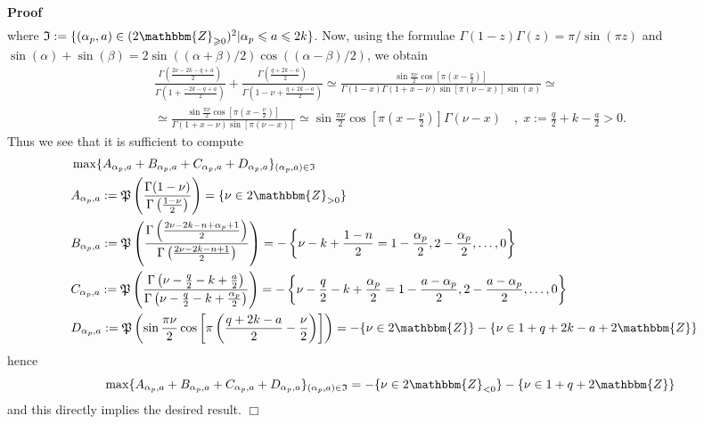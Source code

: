 \documentclass{article}
\newcommand{\assign}{:=}
\renewenvironment{proof}{\noindent\textbf{Proof\ }}{\hspace*{\fill}$\Box$\medskip}
\theoremstyle{remark}
\begin{document}
\begin{proof}
\begin{eqnarray}
    \nonumber
  \end{eqnarray}
  where $\mathfrak{I} \assign \{ (\alpha_p, a) \in (2\mathbbm{Z}_{\geqslant
  0})^2 | \alpha_p \leqslant a \leqslant 2 k \}$. Now, using the formulae
  $\Gamma (1 - z) \Gamma (z) = \pi / \sin (\pi z)$ and $\sin (\alpha) + \sin
  (\beta) = 2 \sin ((\alpha + \beta) / 2) \cos ((\alpha - \beta) / 2)$, we
  obtain
  \begin{eqnarray}
    & \frac{\Gamma \left( \frac{2 \nu - 2 k - q + a}{2} \right)}{\Gamma
    \left( 1 + \frac{- 2 k - q + a}{2} \right)} + \frac{\Gamma \left( \frac{q
    + 2 k - a}{2} \right)}{\Gamma \left( 1 - \nu + \frac{q + 2 k - a}{2}
    \right)} \simeq \frac{\sin \frac{\pi \nu}{2} \cos \left[ \pi \left( x -
    \frac{\nu}{2} \right) \right]}{\Gamma (1 - x) \Gamma (1 + x - \nu) \sin
    [\pi (\nu - x)] \sin (x)} \simeq &  \nonumber\\
    & \simeq \frac{\sin \frac{\pi \nu}{2} \cos \left[ \pi \left( x -
    \frac{\nu}{2} \right) \right]}{\Gamma (1 + x - \nu) \sin [\pi (\nu - x)]}
    \simeq \sin \frac{\pi \nu}{2} \cos \left[ \pi \left( x - \frac{\nu}{2}
    \right) \right] \Gamma (\nu - x) \quad, \; x \assign \frac{q}{2} + k -
    \frac{a}{2} > 0. &  \nonumber
  \end{eqnarray}
  Thus we see that it is sufficient to compute
  \begin{eqnarray}
    & \max \{ A_{\alpha_p, a} + B_{\alpha_p, a} + C_{\alpha_p, a} +
    D_{\alpha_p, a} \}_{(\alpha_p, a) \in \mathfrak{I}} &  \nonumber\\
    & A_{\alpha_p, a} \assign \mathfrak{P} \left( \frac{\Gamma (1 -
    \nu)}{\Gamma \left( \frac{1 - \nu}{2} \right)} \right) = \{ \nu \in
    2\mathbbm{Z}_{> 0} \} &  \nonumber\\
    & B_{\alpha_p, a} \assign \mathfrak{P} \left( \frac{\Gamma \left( \frac{2
    \nu - 2 k - n + \alpha_p + 1}{2} \right)}{\Gamma \left( \frac{2 \nu - 2 k
    - n + 1}{2} \right)} \right) = - \left\{ \nu - k + \frac{1 - n}{2} = 1 -
    \frac{\alpha_p}{2}, 2 - \frac{\alpha_p}{2}, \ldots, 0 \right\} & 
    \nonumber\\
    & C_{\alpha_p, a} \assign \mathfrak{P} \left( \frac{\Gamma \left( \nu -
    \frac{q}{2} - k + \frac{a}{2} \right)}{\Gamma \left( \nu - \frac{q}{2} - k
    + \frac{\alpha_p}{2} \right)} \right) = - \left\{ \nu - \frac{q}{2} - k +
    \frac{\alpha_p}{2} = 1 - \frac{a - \alpha_p}{2}, 2 - \frac{a -
    \alpha_p}{2}, \ldots, 0 \right\} &  \nonumber\\
    & D_{\alpha_p, a} \assign \mathfrak{P} \left( \sin \frac{\pi \nu}{2} \cos
    \left[ \pi \left( \frac{q + 2 k - a}{2} - \frac{\nu}{2} \right) \right]
    \right) = - \{ \nu \in 2\mathbbm{Z} \} - \{ \nu \in 1 + q + 2 k - a +
    2\mathbbm{Z} \} &  \nonumber
  \end{eqnarray}
  hence
  \[ \max \{ A_{\alpha_p, a} + B_{\alpha_p, a} + C_{\alpha_p, a} +
     D_{\alpha_p, a} \}_{(\alpha_p, a) \in \mathfrak{I}} = - \{ \nu \in
     2\mathbbm{Z}_{< 0} \} - \{ \nu \in 1 + q + 2\mathbbm{Z} \} \]
  and this directly implies the desired result.
\end{proof}
\end{document}
